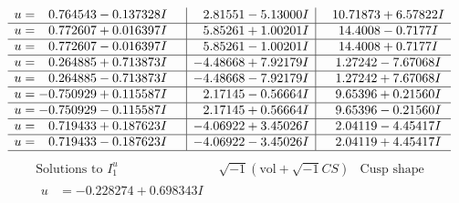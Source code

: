\documentclass[1p]{elsarticle_modified}
\theoremstyle{definition}
\newcommand{\I}{\sqrt{-1}}
\begin{document}
$$\begin{array}{c|c|c}
\begin{aligned}
u &= \phantom{-}0.764543 - 0.137328 I\end{aligned}
 & \phantom{-}2.81551 - 5.13000 I & \phantom{-}10.71873 + 6.57822 I \\ \hline\begin{aligned}
u &= \phantom{-}0.772607 + 0.016397 I\end{aligned}
 & \phantom{-}5.85261 + 1.00201 I & \phantom{-}14.4008 - 0.7177 I \\ \hline\begin{aligned}
u &= \phantom{-}0.772607 - 0.016397 I\end{aligned}
 & \phantom{-}5.85261 - 1.00201 I & \phantom{-}14.4008 + 0.7177 I \\ \hline\begin{aligned}
u &= \phantom{-}0.264885 + 0.713873 I\end{aligned}
 & -4.48668 + 7.92179 I & \phantom{-}1.27242 - 7.67068 I \\ \hline\begin{aligned}
u &= \phantom{-}0.264885 - 0.713873 I\end{aligned}
 & -4.48668 - 7.92179 I & \phantom{-}1.27242 + 7.67068 I \\ \hline\begin{aligned}
u &= -0.750929 + 0.115587 I\end{aligned}
 & \phantom{-}2.17145 - 0.56664 I & \phantom{-}9.65396 + 0.21560 I \\ \hline\begin{aligned}
u &= -0.750929 - 0.115587 I\end{aligned}
 & \phantom{-}2.17145 + 0.56664 I & \phantom{-}9.65396 - 0.21560 I \\ \hline\begin{aligned}
u &= \phantom{-}0.719433 + 0.187623 I\end{aligned}
 & -4.06922 + 3.45026 I & \phantom{-}2.04119 - 4.45417 I \\ \hline\begin{aligned}
u &= \phantom{-}0.719433 - 0.187623 I\end{aligned}
 & -4.06922 - 3.45026 I & \phantom{-}2.04119 + 4.45417 I\\
 \hline 
 \end{array}$$\newpage$$\begin{array}{c|c|c}  
\text{Solutions to }I^u_{1}& \I (\text{vol} + \sqrt{-1}CS) & \text{Cusp shape}\\
 \hline 
\begin{aligned}
u &= -0.228274 + 0.698343 I\end{aligned}

\end{array}$$
\end{document}
